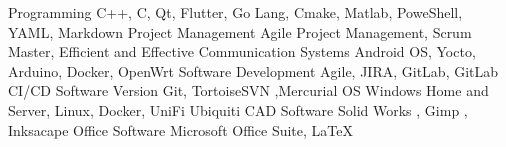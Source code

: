 \begin{cvskills}
  \cvskill
    {Programming} %
    {C++, C, Qt, Flutter, Go Lang, Cmake, Matlab, PoweShell, YAML, Markdown} %
  \cvskill
    {Project Management} %
    {Agile Project Management, Scrum Master, Efficient and Effective Communication} 
  \cvskill
    {Systems} %
    {Android OS, Yocto, Arduino, Docker, OpenWrt} %
  \cvskill
    {Software Development} %
    {Agile, JIRA, GitLab, GitLab CI/CD} %
  \cvskill
    {Software Version} %
    {Git, TortoiseSVN ,Mercurial} %
  \cvskill
    {OS} %
    {Windows Home and Server, Linux, Docker, UniFi Ubiquiti } %
  \cvskill
    {CAD Software} %
    {Solid Works , Gimp , Inksacape} %
  \cvskill
    {Office Software} %
    {Microsoft Office Suite, LaTeX} %
\end{cvskills}
